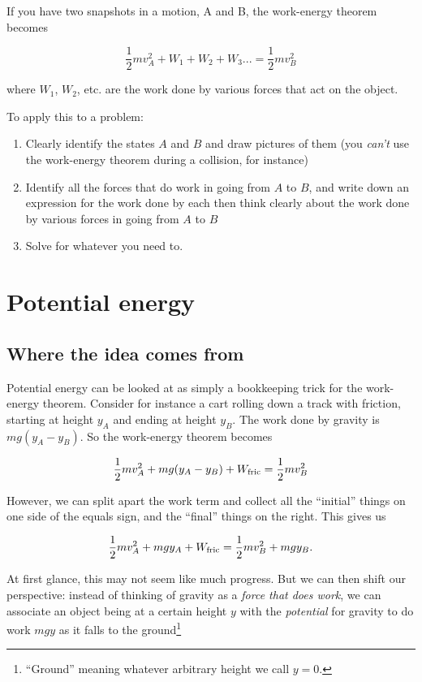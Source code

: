\documentclass[10pt]{article}
\begin{document}
If you have two snapshots in a motion, A and B, the work-energy theorem becomes

\begin{equation}
\frac{1}{2}mv_A^2 + W_1 + W_2 + W_3... = \frac{1}{2}mv_B^2
\end{equation}

where $W_1$, $W_2$, etc. are the work done by various forces that act on the object.

To apply this to a problem:

\begin{enumerate}
	\item Clearly identify the states $A$ and $B$ and draw pictures of them (you {\it can't} use the work-energy theorem during a collision, for instance)
	\item Identify all the forces that do work in going from $A$ to $B$, and write down an expression for the work done by each then think clearly about the work done by various forces in going from $A$ to $B$
	\item Solve for whatever you need to.
\end{enumerate}

\section {Potential energy}

\subsection{Where the idea comes from}

Potential energy can be looked at as simply a bookkeeping trick for the work-energy theorem. Consider for instance a cart rolling down a track with friction, starting at height $y_A$ and ending at height $y_B$. The work done by gravity is $mg(y_A - y_B)$. So the work-energy theorem becomes

$$\frac{1}{2}mv_A^2 + mg(y_A - y_B) + W_{\rm fric} = \frac{1}{2}mv_B^2$$

However, we can split apart the work term and collect all the ``initial'' things on one side of the equals sign, and the ``final'' things on the right. This gives us

$$\frac{1}{2}mv_A^2 + mgy_A + W_{\rm fric} = \frac{1}{2}mv_B^2 + mgy_B.$$

At first glance, this may not seem like much progress. But we can then shift our perspective: instead of thinking of gravity as a {\it force that does work}, we can associate an object being at a certain height $y$ with the {\it potential} for gravity to do work $mgy$ as it falls to the ground\footnote{``Ground'' meaning whatever arbitrary height we call $y=0$.} 
\end{document}
